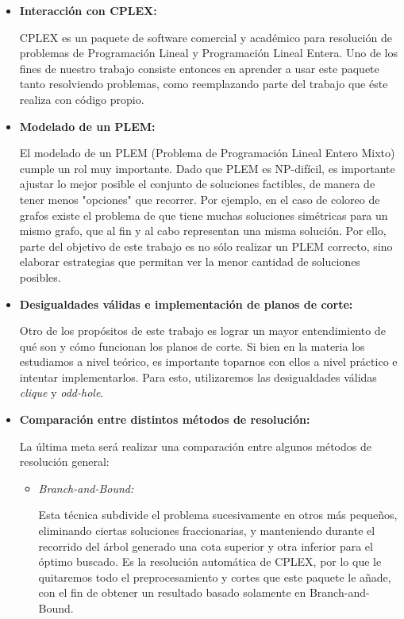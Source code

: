 \documentclass[a4paper]{article}
\begin{document}
\begin{itemize}

	\item {\bf Interacción con CPLEX:}
	
	CPLEX es un paquete de software comercial y académico para resolución de problemas de Programación Lineal y Programación Lineal Entera. Uno de los fines de nuestro trabajo consiste entonces en aprender a usar este paquete tanto resolviendo problemas, como reemplazando parte del trabajo que éste realiza con código propio.
	
	\item {\bf Modelado de un PLEM:}
	
	El modelado de un PLEM (Problema de Programación Lineal Entero Mixto) cumple un rol muy importante. Dado que PLEM es NP-difícil, es importante ajustar lo mejor posible el conjunto de soluciones factibles, de manera de tener menos "opciones" que recorrer.  Por ejemplo, en el caso de coloreo de grafos existe el problema de que tiene muchas soluciones simétricas para un mismo grafo, que al fin y al cabo representan una misma solución.  Por ello, parte del objetivo de este trabajo es no sólo realizar un PLEM correcto, sino elaborar estrategias que permitan ver la menor cantidad de soluciones posibles.
	
	\item {\bf Desigualdades válidas e implementación de planos de corte:}
	
	Otro de los propósitos de este trabajo es lograr un mayor entendimiento de qué son y cómo funcionan los planos de corte. Si bien en la materia los estudiamos a nivel teórico, es importante toparnos con ellos a nivel práctico e intentar implementarlos. Para esto, utilizaremos las desigualdades válidas {\it clique} y {\it odd-hole}.

	\item {\bf Comparación entre distintos métodos de resolución:}
	
	La última meta será realizar una comparación entre algunos métodos de resolución general:
	
	\begin{itemize}
	
		\item {\it Branch-and-Bound:}
		
		Esta técnica subdivide el problema sucesivamente en otros más pequeños, eliminando ciertas soluciones fraccionarias, y manteniendo durante el recorrido del árbol generado una cota superior y otra
inferior para el óptimo buscado. Es la resolución automática de CPLEX, por lo que le quitaremos todo el preprocesamiento y cortes que este paquete le añade, con el fin de obtener un resultado basado solamente en Branch-and-Bound.
		

\end{itemize}
\end{itemize}
\end{document}
